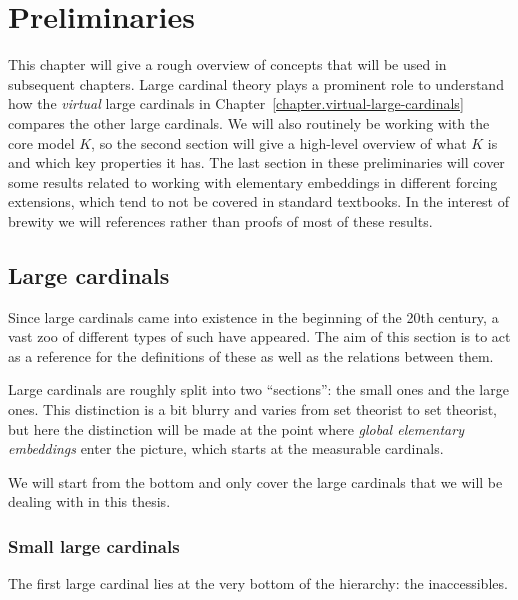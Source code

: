 \documentclass[../../main]{subfiles}
\begin{document}
\chapter{Preliminaries}
\thispagestyle{fancy}

This chapter will give a rough overview of concepts that will be used in subsequent chapters. Large cardinal theory plays a prominent role to understand how the \textit{virtual} large cardinals in Chapter~\ref{chapter.virtual-large-cardinals} compares the other large cardinals. We will also routinely be working with the core model $K$, so the second section will give a high-level overview of what $K$ is and which key properties it has. The last section in these preliminaries will cover some results related to working with elementary embeddings in different forcing extensions, which tend to not be covered in standard textbooks. In the interest of brewity we will references rather than proofs of most of these results.

\section{Large cardinals}
\label{prelims.large-cardinals}

Since large cardinals came into existence in the beginning of the 20th century, a vast zoo of different types of such have appeared. The aim of this section is to act as a reference for the definitions of these as well as the relations between them.

\qquad Large cardinals are roughly split into two ``sections'': the small ones and the large ones. This distinction is a bit blurry and varies from set theorist to set theorist, but here the distinction will be made at the point where \textit{global elementary embeddings} enter the picture, which starts at the measurable cardinals.

\qquad We will start from the bottom and only cover the large cardinals that we will be dealing with in this thesis.

\subsection{Small large cardinals}

The first large cardinal lies at the very bottom of the hierarchy: the inaccessibles.

\end{document}
